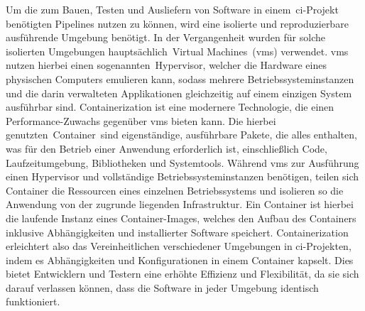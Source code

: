 Um die zum Bauen, Testen und Ausliefern von Software in einem\ \acrshort{ci}-Projekt benötigten Pipelines nutzen zu
können, wird eine isolierte und reproduzierbare ausführende Umgebung benötigt.
In der Vergangenheit wurden für solche isolierten Umgebungen hauptsächlich\ \glqq Virtual
Machines\grqq\ (\acrshort{vm}s) verwendet.
\acrshort{vm}s nutzen hierbei einen sogenannten\ \glqq Hypervisor\grqq, welcher die Hardware eines physischen Computers
emulieren kann, sodass mehrere Betriebssysteminstanzen und die darin verwalteten Applikationen gleichzeitig auf einem
einzigen System ausführbar sind.
Containerization ist eine modernere Technologie, die einen Performance-Zuwachs gegenüber \acrshort{vm}s bieten kann.
Die hierbei genutzten\ \glqq Container\grqq\ sind eigenständige, ausführbare Pakete, die alles enthalten, was für den
Betrieb einer Anwendung erforderlich ist, einschließlich Code, Laufzeitumgebung, Bibliotheken und Systemtools.
Während \acrshort{vm}s zur Ausführung einen Hypervisor und vollständige Betriebssysteminstanzen benötigen, teilen sich
Container die Ressourcen eines einzelnen Betriebssystems und isolieren so die Anwendung von der zugrunde liegenden
Infrastruktur.
Ein Container ist hierbei die laufende Instanz eines Container-Images, welches den Aufbau des Containers inklusive
Abhängigkeiten und installierter Software speichert.
Containerization erleichtert also das Vereinheitlichen verschiedener Umgebungen in \acrshort{ci}-Projekten, indem es
Abhängigkeiten und Konfigurationen in einem Container kapselt.
Dies bietet Entwicklern und Testern eine erhöhte Effizienz und Flexibilität, da sie sich darauf verlassen können, dass
die Software in jeder Umgebung identisch funktioniert.

